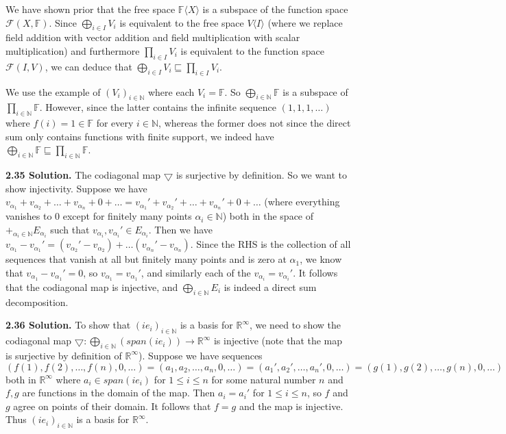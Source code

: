 We have shown prior that the free space $\mathbb{F}\langle X \rangle$ is a subspace of the function space $\mathcal{F}(X,\mathbb{F})$. Since $\bigoplus_{i \in I}V_i$ is equivalent to the free space $V\langle I \rangle$ (where we replace field addition with vector addition and field multiplication with scalar multiplication) and furthermore $\prod_{i \in I}V_i$ is equivalent to the function space $\mathcal{F}(I,V)$, we can deduce that $\bigoplus_{i \in I}V_i \sqsubseteq \prod_{i \in I}V_i$.

We use the example of $(V_i)_{i \in \mathbb{N}}$ where each $V_i = \mathbb{F}$. So $\bigoplus_{i \in \mathbb{N}}\mathbb{F}$ is a subspace of $\prod_{i \in \mathbb{N}}\mathbb{F}$. However, since the latter contains the infinite sequence $(1,1,1,\ldots)$ where $f(i) = 1 \in \mathbb{F}$ for every $i \in \mathbb{N}$, whereas the former does not since the direct sum only contains functions with finite support, we indeed have $\bigoplus_{i \in \mathbb{N}}\mathbb{F} \sqsubseteq \prod_{i \in \mathbb{N}}\mathbb{F}$.

\textbf{2.35 Solution.} The codiagonal map $\bigtriangledown$ is surjective by definition. So we want to show injectivity. Suppose we have $v_{\alpha_1} + v_{\alpha_2} + \ldots + v_{\alpha_n} + 0 + \ldots = v_{\alpha_1}' + v_{\alpha_2}' + \ldots + v_{\alpha_n}' + 0 + \ldots$ (where everything vanishes to 0 except for finitely many points $\alpha_i \in \mathbb{N}$) both in the space of $+_{\alpha_i \in \mathbb{N}}E_{\alpha_i}$ such that $v_{\alpha_i},v_{\alpha_i}' \in E_{\alpha_i}$. Then we have $v_{\alpha_1} - v_{\alpha_1}' = (v_{\alpha_2}' - v_{\alpha_2}) + \ldots (v_{\alpha_n}' - v_{\alpha_n})$. Since the RHS is the collection of all sequences that vanish at all but finitely many points and is zero at $\alpha_1$, we know that $v_{\alpha_1} - v_{\alpha_1}' = 0$, so $v_{\alpha_1} = v_{\alpha_1}'$, and similarly each of the $v_{\alpha_i} = v_{\alpha_i}'$. It follows that the codiagonal map is injective, and $\bigoplus_{i \in \mathbb{N}}E_i$ is indeed a direct sum decomposition.

\textbf{2.36 Solution.} To show that $(ie_i)_{i \in \mathbb{N}}$ is a basis for $\mathbb{R}^{\infty}$, we need to show the codiagonal map $\bigtriangledown: \bigoplus_{i \in \mathbb{N}}(span(ie_i)) \to \mathbb{R}^{\infty}$ is injective (note that the map is surjective by definition of $\mathbb{R}^{\infty}$). Suppose we have sequences $(f(1),f(2),\ldots,f(n),0,\ldots) = (a_1,a_2,\ldots,a_n,0,\ldots) = (a_1',a_2',\ldots,a_n',0,\ldots) = (g(1),g(2),\ldots,g(n),0,\ldots)$ both in $\mathbb{R}^{\infty}$ where $a_i \in span(ie_i)$ for $1 \leq i \leq n$ for some natural number $n$ and $f,g$ are functions in the domain of the map. Then $a_i = a_i'$ for $1 \leq i \leq n$, so $f$ and $g$ agree on points of their domain. It follows that $f=g$ and the map is injective. Thus $(ie_i)_{i \in \mathbb{N}}$ is a basis for $\mathbb{R}^{\infty}$.

